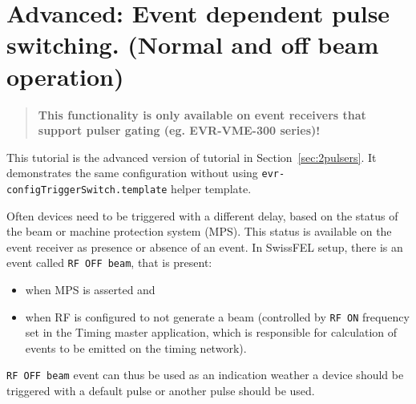 \documentclass[12pt,a4paper]{article}
\begin{document}
\section{Advanced: Event dependent pulse switching. (Normal and off beam operation)}\label{sec:triggerSwitching}
\begin{quote}
\textbf{This functionality is only available on event receivers that support pulser gating (eg. EVR-VME-300 series)!}
\end{quote}

This tutorial is the advanced version of tutorial in Section~\ref{sec:2pulsers}. It demonstrates the same configuration without using \texttt{evr-configTriggerSwitch.template} helper template.

Often devices need to be triggered with a different delay, based on the status of the beam or machine protection system (MPS). This status is available on the event receiver as presence or absence of an event. In SwissFEL setup, there is an event called \texttt{RF OFF beam}, that is present:
\begin{itemize}
\item when MPS is asserted and
\item when RF is configured to not generate a beam (controlled by \texttt{RF ON} frequency set in the Timing master application, which is responsible for calculation of events to be emitted on the timing network).
\end{itemize}
\texttt{RF OFF beam} event can thus be used as an indication weather a device should be triggered with a default pulse or another pulse should be used.
\end{document}
